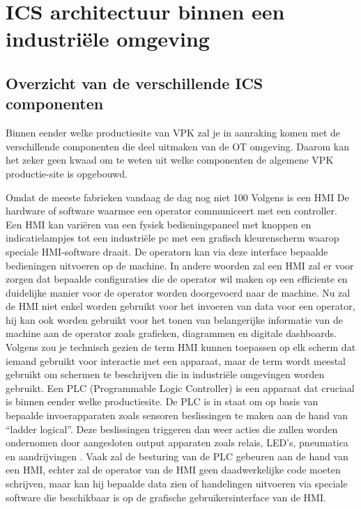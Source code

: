 \section{ICS architectuur binnen een industriële omgeving}
\subsection{Overzicht van de verschillende ICS componenten}
Binnen eender welke productiesite van VPK zal je in aanraking komen met de verschillende componenten die deel uitmaken van de OT omgeving. Daarom kan het zeker geen kwaad om te weten uit welke componenten de algemene VPK productie-site is opgebouwd. 

Omdat de meeste fabrieken vandaag de dag nog niet 100%
Volgens \textcite{Nist2025} is een HMI De hardware of software waarmee een operator communiceert met een controller. Een HMI kan variëren van een fysiek bedieningspaneel met knoppen en indicatielampjes tot een industriële pc met een grafisch kleurenscherm waarop speciale HMI-software draait. De operatorn kan via deze interface bepaalde bedieningen uitvoeren op de machine. In andere woorden zal een HMI zal er voor zorgen dat bepaalde configuraties die de operator wil maken op een efficiente en duidelijke manier voor de operator worden doorgevoerd naar de machine. 
Nu zal de HMI niet enkel worden gebruikt voor het invoeren van data voor een operator, hij kan ook worden gebruikt voor het tonen van belangerijke informatie van de machine aan de operator zoals grafieken, diagrammen en digitale dashboards. \autocite{Inductive2025}
Volgens \textcite{Copadata2025} zou je technisch gezien de term HMI kunnen toepassen op elk scherm dat iemand gebruikt voor interactie met een apparaat, maar de term wordt meestal gebruikt om schermen te beschrijven die in industriële omgevingen worden gebruikt. 
Een PLC (Programmable Logic Controller) is een apparaat dat cruciaal is binnen eender welke productiesite. De PLC is in staat om op basis van bepaalde invoerapparaten zoals sensoren beslissingen te maken aan de hand van “ladder logical”. Deze beslissingen triggeren dan weer acties die zullen worden ondernomen door aangesloten output apparaten zoals relais, LED’s, pneumatica en aandrijvingen \autocite{unitronics2025}.
Vaak zal de besturing van de PLC gebeuren aan de hand van een HMI, echter zal de operator van de HMI geen daadwerkelijke code moeten schrijven, maar kan hij bepaalde data zien of handelingen uitvoeren via speciale software die beschikbaar is op de grafische gebruikersinterface van de HMI. 

